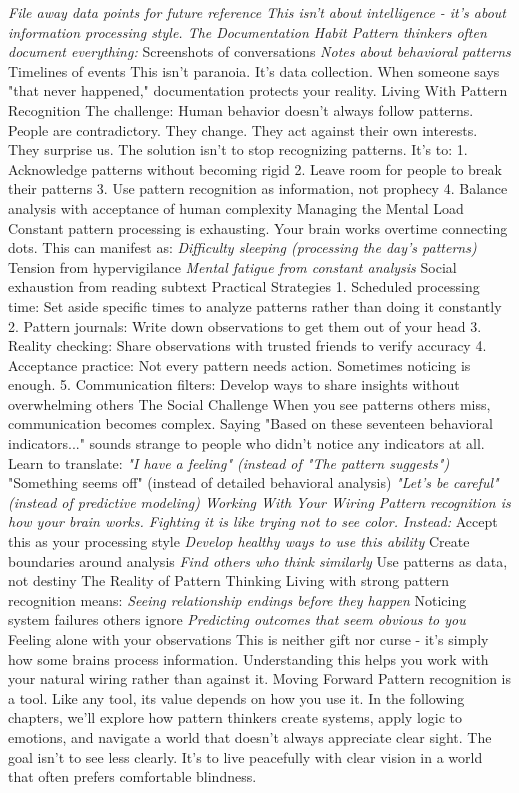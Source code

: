 \documentclass[12pt]{book}
\begin{document}
\textit{ File away data points for future reference
This isn't about intelligence - it's about information processing style.
The Documentation Habit
Pattern thinkers often document everything:
} Screenshots of conversations
\textit{ Notes about behavioral patterns
} Timelines of events
This isn't paranoia. It's data collection. When someone says "that never happened," documentation protects your reality.
Living With Pattern Recognition
The challenge: Human behavior doesn't always follow patterns. People are contradictory. They change. They act against their own interests. They surprise us.
The solution isn't to stop recognizing patterns. It's to:
1. Acknowledge patterns without becoming rigid
2. Leave room for people to break their patterns
3. Use pattern recognition as information, not prophecy
4. Balance analysis with acceptance of human complexity
Managing the Mental Load
Constant pattern processing is exhausting. Your brain works overtime connecting dots. This can manifest as:
\textit{ Difficulty sleeping (processing the day's patterns)
} Tension from hypervigilance
\textit{ Mental fatigue from constant analysis
} Social exhaustion from reading subtext
Practical Strategies
1. Scheduled processing time: Set aside specific times to analyze patterns rather than doing it constantly
2. Pattern journals: Write down observations to get them out of your head
3. Reality checking: Share observations with trusted friends to verify accuracy
4. Acceptance practice: Not every pattern needs action. Sometimes noticing is enough.
5. Communication filters: Develop ways to share insights without overwhelming others
The Social Challenge
When you see patterns others miss, communication becomes complex. Saying "Based on these seventeen behavioral indicators..." sounds strange to people who didn't notice any indicators at all.
Learn to translate:
\textit{ "I have a feeling" (instead of "The pattern suggests")
} "Something seems off" (instead of detailed behavioral analysis)
\textit{ "Let's be careful" (instead of predictive modeling)
Working With Your Wiring
Pattern recognition is how your brain works. Fighting it is like trying not to see color. Instead:
} Accept this as your processing style
\textit{ Develop healthy ways to use this ability
} Create boundaries around analysis
\textit{ Find others who think similarly
} Use patterns as data, not destiny
The Reality of Pattern Thinking
Living with strong pattern recognition means:
\textit{ Seeing relationship endings before they happen
} Noticing system failures others ignore
\textit{ Predicting outcomes that seem obvious to you
} Feeling alone with your observations
This is neither gift nor curse - it's simply how some brains process information. Understanding this helps you work with your natural wiring rather than against it.
Moving Forward
Pattern recognition is a tool. Like any tool, its value depends on how you use it. In the following chapters, we'll explore how pattern thinkers create systems, apply logic to emotions, and navigate a world that doesn't always appreciate clear sight.
The goal isn't to see less clearly. It's to live peacefully with clear vision in a world that often prefers comfortable blindness.
\end{document}
